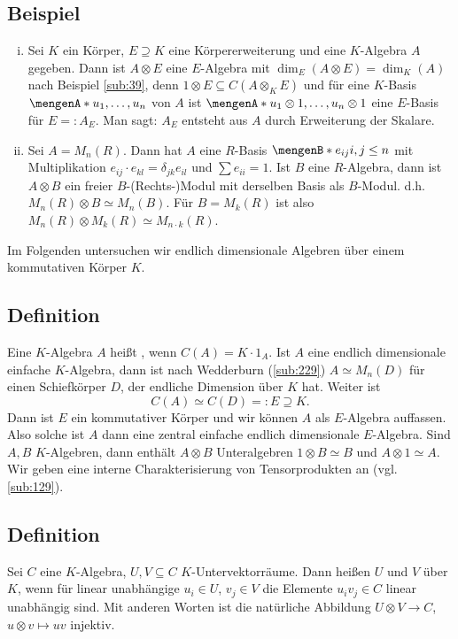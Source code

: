 \subsection[Beispiel: Erweiterung der Skalare]{Beispiel} %
\label{sub:314}
\begin{enumerate}[(i)]
	\item Sei $K$ ein Körper, $E \supseteq K$ eine Körpererweiterung und eine $K$-Algebra $A$ gegeben. Dann ist $A \otimes E$ eine $E$-Algebra mit 
	$\dim_E(A \otimes E)= \dim_K(A)$ nach Beispiel \ref{sub:39}, denn $1 \otimes E \subseteq C(A \otimes_K E)$ und für eine $K$-Basis $\set{u_1, \ldots , u_n}$ von $A$ ist 
	$\set{u_1 \otimes 1, \ldots , u_n \otimes 1} $ eine $E$-Basis für $E =: A_E$. Man sagt: $A_E$ entsteht aus $A$ durch Erweiterung der Skalare.
	\item Sei $A= M_n(R)$. Dann hat $A$ eine $R$-Basis $\set[e_{ij}]{i,j \le n}$ mit Multiplikation $e_{ij} \cdot e_{kl}= \delta_{jk} e_{il}$ und $\sum e_{ii} = 1$.
	Ist $B$ eine $R$-Algebra, dann ist $A \otimes B$ ein freier $B$-(Rechts-)Modul mit derselben Basis als $B$-Modul. d.h. $M_n(R) \otimes B \simeq M_n(B)$. Für $B=M_k(R)$
	ist also $M_n(R) \otimes M_k(R) \simeq M_{n \cdot k}(R)$.
\end{enumerate}
Im Folgenden untersuchen wir endlich dimensionale Algebren über einem kommutativen Körper $K$.

\subsection[Definition: Zentrale Algebra]{Definition} %
\label{sub:315}
Eine $K$-Algebra $A$ heißt , wenn $C(A)= K \cdot 1_A$. Ist $A$ eine endlich dimensionale einfache $K$-Algebra, dann ist nach Wedderburn (\ref{sub:229}) $A \simeq M_n(D)$ für einen Schiefkörper $D$, der endliche Dimension über $K$ hat. Weiter ist 
\[
	C(A) \simeq C(D) =: E \supseteq K.
\]
Dann ist $E$ ein kommutativer Körper und wir können $A$ als $E$-Algebra auffassen. Also solche ist $A$ dann eine zentral einfache endlich dimensionale $E$-Algebra.
Sind $A,B$ $K$-Algebren, dann enthält $A \otimes B$ Unteralgebren $1 \otimes B \simeq B$ und $A \otimes 1 \simeq A$. Wir geben eine interne Charakterisierung von
Tensorprodukten an (vgl. \ref{sub:129}). 

\subsection[Definition: Linear disjunkt]{Definition} %
\label{sub:316}
Sei $C$ eine $K$-Algebra, $U,V \subseteq C$ $K$-Untervektorräume. Dann heißen $U$ und $V$  über $K$, wenn für linear unabhängige $u_i \in U$, 
$v_j \in V$ die Elemente $u_i v_j \in C$ linear unabhängig sind. Mit anderen Worten ist die natürliche Abbildung $U  \otimes V \to C$, $u \otimes v \mapsto u v$ injektiv.

